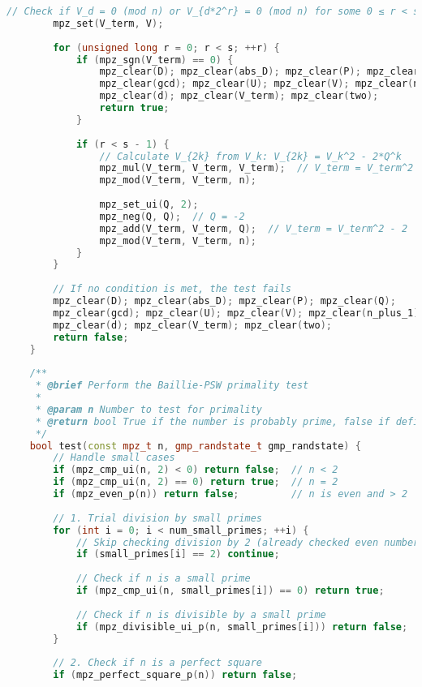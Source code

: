 \begin{lstlisting}[language=C++, caption=Baillie-PSW Test Implementation]
        // Check if V_d = 0 (mod n) or V_{d*2^r} = 0 (mod n) for some 0 ≤ r < s
        mpz_set(V_term, V);
        
        for (unsigned long r = 0; r < s; ++r) {
            if (mpz_sgn(V_term) == 0) {
                mpz_clear(D); mpz_clear(abs_D); mpz_clear(P); mpz_clear(Q);
                mpz_clear(gcd); mpz_clear(U); mpz_clear(V); mpz_clear(n_plus_1);
                mpz_clear(d); mpz_clear(V_term); mpz_clear(two);
                return true;
            }
            
            if (r < s - 1) {
                // Calculate V_{2k} from V_k: V_{2k} = V_k^2 - 2*Q^k
                mpz_mul(V_term, V_term, V_term);  // V_term = V_term^2
                mpz_mod(V_term, V_term, n);
                
                mpz_set_ui(Q, 2);
                mpz_neg(Q, Q);  // Q = -2
                mpz_add(V_term, V_term, Q);  // V_term = V_term^2 - 2
                mpz_mod(V_term, V_term, n);
            }
        }
        
        // If no condition is met, the test fails
        mpz_clear(D); mpz_clear(abs_D); mpz_clear(P); mpz_clear(Q);
        mpz_clear(gcd); mpz_clear(U); mpz_clear(V); mpz_clear(n_plus_1);
        mpz_clear(d); mpz_clear(V_term); mpz_clear(two);
        return false;
    }
    
    /**
     * @brief Perform the Baillie-PSW primality test
     * 
     * @param n Number to test for primality
     * @return bool True if the number is probably prime, false if definitely composite
     */
    bool test(const mpz_t n, gmp_randstate_t gmp_randstate) {
        // Handle small cases
        if (mpz_cmp_ui(n, 2) < 0) return false;  // n < 2
        if (mpz_cmp_ui(n, 2) == 0) return true;  // n = 2
        if (mpz_even_p(n)) return false;         // n is even and > 2
        
        // 1. Trial division by small primes
        for (int i = 0; i < num_small_primes; ++i) {
            // Skip checking division by 2 (already checked even numbers)
            if (small_primes[i] == 2) continue;
            
            // Check if n is a small prime
            if (mpz_cmp_ui(n, small_primes[i]) == 0) return true;
            
            // Check if n is divisible by a small prime
            if (mpz_divisible_ui_p(n, small_primes[i])) return false;
        }
        
        // 2. Check if n is a perfect square
        if (mpz_perfect_square_p(n)) return false;
        

\end{lstlisting}
